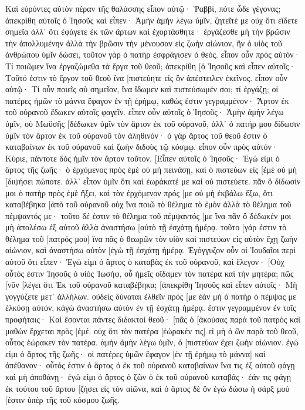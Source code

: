 Καὶ εὑρόντες αὐτὸν πέραν τῆς θαλάσσης εἶπον αὐτῷ· Ῥαββί, πότε ὧδε γέγονας; 
ἀπεκρίθη αὐτοῖς ὁ Ἰησοῦς καὶ εἶπεν· Ἀμὴν ἀμὴν λέγω ὑμῖν, ζητεῖτέ με οὐχ ὅτι εἴδετε σημεῖα ἀλλ᾽ ὅτι ἐφάγετε ἐκ τῶν ἄρτων καὶ ἐχορτάσθητε· 
ἐργάζεσθε μὴ τὴν βρῶσιν τὴν ἀπολλυμένην ἀλλὰ τὴν βρῶσιν τὴν μένουσαν εἰς ζωὴν αἰώνιον, ἣν ὁ υἱὸς τοῦ ἀνθρώπου ὑμῖν δώσει, τοῦτον γὰρ ὁ πατὴρ ἐσφράγισεν ὁ θεός. 
εἶπον οὖν πρὸς αὐτόν· Τί ποιῶμεν ἵνα ἐργαζώμεθα τὰ ἔργα τοῦ θεοῦ; 
ἀπεκρίθη [ὁ Ἰησοῦς καὶ εἶπεν αὐτοῖς· Τοῦτό ἐστιν τὸ ἔργον τοῦ θεοῦ ἵνα [πιστεύητε εἰς ὃν ἀπέστειλεν ἐκεῖνος. 
εἶπον οὖν αὐτῷ· Τί οὖν ποιεῖς σὺ σημεῖον, ἵνα ἴδωμεν καὶ πιστεύσωμέν σοι; τί ἐργάζῃ; 
οἱ πατέρες ἡμῶν τὸ μάννα ἔφαγον ἐν τῇ ἐρήμῳ, καθώς ἐστιν γεγραμμένον· Ἄρτον ἐκ τοῦ οὐρανοῦ ἔδωκεν αὐτοῖς φαγεῖν. 
εἶπεν οὖν αὐτοῖς ὁ Ἰησοῦς· Ἀμὴν ἀμὴν λέγω ὑμῖν, οὐ Μωϋσῆς [δέδωκεν ὑμῖν τὸν ἄρτον ἐκ τοῦ οὐρανοῦ, ἀλλ᾽ ὁ πατήρ μου δίδωσιν ὑμῖν τὸν ἄρτον ἐκ τοῦ οὐρανοῦ τὸν ἀληθινόν· 
ὁ γὰρ ἄρτος τοῦ θεοῦ ἐστιν ὁ καταβαίνων ἐκ τοῦ οὐρανοῦ καὶ ζωὴν διδοὺς τῷ κόσμῳ. 
εἶπον οὖν πρὸς αὐτόν· Κύριε, πάντοτε δὸς ἡμῖν τὸν ἄρτον τοῦτον. 
[Εἶπεν αὐτοῖς ὁ Ἰησοῦς· Ἐγώ εἰμι ὁ ἄρτος τῆς ζωῆς· ὁ ἐρχόμενος πρὸς ἐμὲ οὐ μὴ πεινάσῃ, καὶ ὁ πιστεύων εἰς [ἐμὲ οὐ μὴ [διψήσει πώποτε. 
ἀλλ᾽ εἶπον ὑμῖν ὅτι καὶ ἑωράκατέ με καὶ οὐ πιστεύετε. 
πᾶν ὃ δίδωσίν μοι ὁ πατὴρ πρὸς ἐμὲ ἥξει, καὶ τὸν ἐρχόμενον πρός [με οὐ μὴ ἐκβάλω ἔξω, 
ὅτι καταβέβηκα [ἀπὸ τοῦ οὐρανοῦ οὐχ ἵνα ποιῶ τὸ θέλημα τὸ ἐμὸν ἀλλὰ τὸ θέλημα τοῦ πέμψαντός με· 
τοῦτο δέ ἐστιν τὸ θέλημα τοῦ πέμψαντός [με ἵνα πᾶν ὃ δέδωκέν μοι μὴ ἀπολέσω ἐξ αὐτοῦ ἀλλὰ ἀναστήσω [αὐτὸ τῇ ἐσχάτῃ ἡμέρᾳ. 
τοῦτο [γάρ ἐστιν τὸ θέλημα τοῦ [πατρός μου] ἵνα πᾶς ὁ θεωρῶν τὸν υἱὸν καὶ πιστεύων εἰς αὐτὸν ἔχῃ ζωὴν αἰώνιον, καὶ ἀναστήσω αὐτὸν [ἐγὼ τῇ ἐσχάτῃ ἡμέρᾳ. 
Ἐγόγγυζον οὖν οἱ Ἰουδαῖοι περὶ αὐτοῦ ὅτι εἶπεν· Ἐγώ εἰμι ὁ ἄρτος ὁ καταβὰς ἐκ τοῦ οὐρανοῦ, 
καὶ ἔλεγον· [Οὐχ οὗτός ἐστιν Ἰησοῦς ὁ υἱὸς Ἰωσήφ, οὗ ἡμεῖς οἴδαμεν τὸν πατέρα καὶ τὴν μητέρα; πῶς [νῦν [λέγει ὅτι Ἐκ τοῦ οὐρανοῦ καταβέβηκα; 
[ἀπεκρίθη Ἰησοῦς καὶ εἶπεν αὐτοῖς· Μὴ γογγύζετε μετ᾽ ἀλλήλων. 
οὐδεὶς δύναται ἐλθεῖν πρός [με ἐὰν μὴ ὁ πατὴρ ὁ πέμψας με ἑλκύσῃ αὐτόν, κἀγὼ ἀναστήσω αὐτὸν ἐν τῇ ἐσχάτῃ ἡμέρᾳ. 
ἔστιν γεγραμμένον ἐν τοῖς προφήταις· Καὶ ἔσονται πάντες διδακτοὶ θεοῦ· [πᾶς ὁ [ἀκούσας παρὰ τοῦ πατρὸς καὶ μαθὼν ἔρχεται πρὸς [ἐμέ. 
οὐχ ὅτι τὸν πατέρα [ἑώρακέν τις] εἰ μὴ ὁ ὢν παρὰ τοῦ θεοῦ, οὗτος ἑώρακεν τὸν πατέρα. 
ἀμὴν ἀμὴν λέγω ὑμῖν, ὁ [πιστεύων ἔχει ζωὴν αἰώνιον. 
ἐγώ εἰμι ὁ ἄρτος τῆς ζωῆς· 
οἱ πατέρες ὑμῶν ἔφαγον [ἐν τῇ ἐρήμῳ τὸ μάννα] καὶ ἀπέθανον· 
οὗτός ἐστιν ὁ ἄρτος ὁ ἐκ τοῦ οὐρανοῦ καταβαίνων ἵνα τις ἐξ αὐτοῦ φάγῃ καὶ μὴ ἀποθάνῃ· 
ἐγώ εἰμι ὁ ἄρτος ὁ ζῶν ὁ ἐκ τοῦ οὐρανοῦ καταβάς· ἐάν τις φάγῃ ἐκ τούτου τοῦ ἄρτου [ζήσει εἰς τὸν αἰῶνα, καὶ ὁ ἄρτος δὲ ὃν ἐγὼ δώσω ἡ σάρξ μού [ἐστιν ὑπὲρ τῆς τοῦ κόσμου ζωῆς. 
